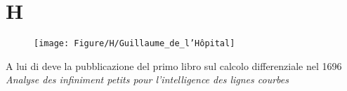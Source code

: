 \chapter{H}
\vspace{5mm}
\begin{figure}
	\centering{}
	\texttt{[image: Figure/H/Guillaume\_de\_l'Hôpital]}
	\label{fig:guillaumedelhopital}
\end{figure}
A lui di deve la pubblicazione del primo libro sul calcolo differenziale nel 1696 \textit{Analyse des infiniment petits pour l'intelligence des lignes courbes}
